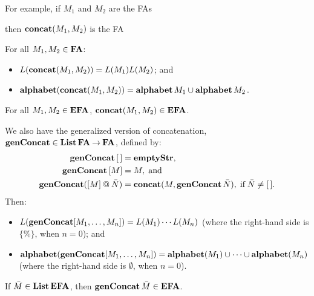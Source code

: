 For example, if $M_1$ and $M_2$ are the FAs
\begin{center}


\end{center}
then $\mathbf{concat}(M_1,M_2)$ is the FA
\begin{center}

\end{center}

\begin{proposition}
For all $M_1,M_2\in\mathbf{FA}$:
\begin{itemize}
\item $L(\mathbf{concat}(M_1,M_2))=L(M_1)L(M_2)$; and

\item $\mathbf{alphabet}(\mathbf{concat}(M_1,M_2))=\mathbf{alphabet}\,M_1\cup\mathbf{alphabet}\,M_2$.
\end{itemize}
\end{proposition}

\begin{proposition}
For all $M_1,M_2\in\mathbf{EFA}$, $\mathbf{concat}(M_1,M_2)\in\mathbf{EFA}$.
\end{proposition}

We also have the generalized version of concatenation,
$\mathbf{genConcat}\in\mathbf{List}\,\mathbf{FA}\mathbin{\to}\mathbf{FA}$,
 defined by:
\begin{align*}
\mathbf{genConcat}\,[\,] &= \mathbf{emptyStr} , \\
\mathbf{genConcat}\,[M] &= M , \;\allowbreak\mbox{and}\allowbreak\; \\
\mathbf{genConcat}([M] \mathbin{@} \bar{N}) &=
\mathbf{concat}(M, \mathbf{genConcat}\,\bar{N}) , \;\allowbreak\mbox{if}\allowbreak\; \bar{N}\neq [\,] .
\end{align*}
Then:
\begin{itemize}
\item $L(\mathbf{genConcat} [M_1,\ldots,M_n]) = L(M_1)\cdots L(M_n)$ (where
  the right-hand side is $\{\%\}$, when $n = 0$); and
\item
  $\mathbf{alphabet}(\mathbf{genConcat} [M_1,\ldots,M_n]) =
  \mathbf{alphabet}(M_1)\cup\cdots\cup \mathbf{alphabet}(M_n)$ (where the right-hand
  side is $\emptyset$, when $n = 0$).
\end{itemize}
If $\bar{M}\in\mathbf{List}\,\mathbf{EFA}$, then $\mathbf{genConcat}\,\bar{M}\in\mathbf{EFA}$.

